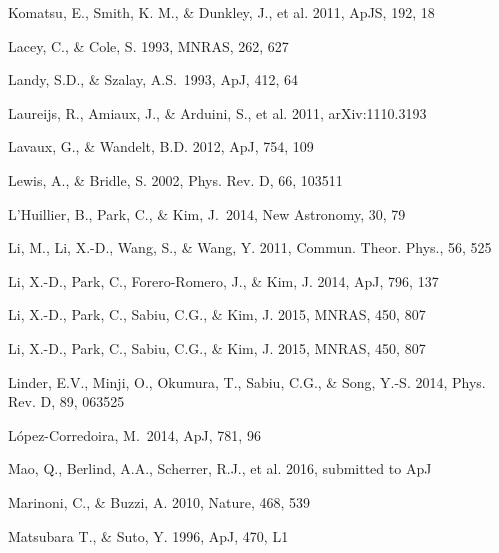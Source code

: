 \documentclass[useAMS,usenatbib]{mnras}
\begin{document}
\begin{thebibliography}{}
Komatsu, E., Smith, K. M., \& Dunkley, J., et al. 2011, ApJS, 192, 18  

Lacey, C., \& Cole, S. 1993, MNRAS, 262, 627


Landy, S.D., \& Szalay, A.S.\ 1993, ApJ, 412, 64 

Laureijs, R., Amiaux, J., \& Arduini, S., et al. 2011, arXiv:1110.3193

Lavaux, G., \& Wandelt, B.D. 2012, ApJ, 754, 109  


Lewis, A., \& Bridle, S. 2002, Phys. Rev. D, 66, 103511

L'Huillier, B., Park, C., \& Kim, J.\ 2014, New Astronomy, 30, 79 

Li, M., Li, X.-D., Wang, S., \& Wang, Y. 2011, Commun. Theor. Phys., 56, 525

Li, X.-D., Park, C., Forero-Romero, J., \& Kim, J. 2014, ApJ, 796, 137

Li, X.-D., Park, C., Sabiu, C.G., \& Kim, J. 2015, MNRAS, 450, 807 

Li, X.-D., Park, C., Sabiu, C.G., \& Kim, J. 2015, MNRAS, 450, 807 


Linder, E.V., Minji, O., Okumura, T., Sabiu, C.G., \& Song, Y.-S. 2014, Phys. Rev. D, 89, 063525  

L{\'o}pez-Corredoira, M.\ 2014, ApJ, 781, 96 

Mao, Q., Berlind, A.A., Scherrer, R.J., et al. 2016, submitted to ApJ

Marinoni, C., \& Buzzi, A. 2010, Nature, 468, 539  

Matsubara T., \& Suto, Y. 1996, ApJ, 470, L1  


\end{thebibliography}
\end{document}
